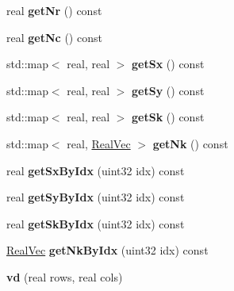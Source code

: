 \begin{DoxyCompactItemize}
\item 
\mbox{\label{classvd_a1a1634d6906eb0af4d877c2af3292ca7}} 
real {\bfseries get\+Nr} () const
\item 
\mbox{\label{classvd_ab0de0a5b8929ed7a7bb6ca902a462dd4}} 
real {\bfseries get\+Nc} () const
\item 
\mbox{\label{classvd_a340f3f92b9ae32ff0f3eb2ce6cf12bd6}} 
std\+::map$<$ real, real $>$ {\bfseries get\+Sx} () const
\item 
\mbox{\label{classvd_a13a2a103b632b3acf41b925b5b31449e}} 
std\+::map$<$ real, real $>$ {\bfseries get\+Sy} () const
\item 
\mbox{\label{classvd_a5c6dc6e749c955b5ee26139e19a02e0b}} 
std\+::map$<$ real, real $>$ {\bfseries get\+Sk} () const
\item 
\mbox{\label{classvd_a90613fc46f246a5450e26487caff33f9}} 
std\+::map$<$ real, \mbox{\hyperlink{aux_8h_ac0a1a538b45426e056715d1f59f854ab}{Real\+Vec}} $>$ {\bfseries get\+Nk} () const
\item 
\mbox{\label{classvd_a960d4b8fbedb7cbb0686ad42e19d6396}} 
real {\bfseries get\+Sx\+By\+Idx} (uint32 idx) const
\item 
\mbox{\label{classvd_a0f630fc80e57d3e17ab036f75afde006}} 
real {\bfseries get\+Sy\+By\+Idx} (uint32 idx) const
\item 
\mbox{\label{classvd_a4d2c835e7804c4242dce6d411f01ce0a}} 
real {\bfseries get\+Sk\+By\+Idx} (uint32 idx) const
\item 
\mbox{\label{classvd_a4d058d2d1d675a741a83776c95b2acfb}} 
\mbox{\hyperlink{aux_8h_ac0a1a538b45426e056715d1f59f854ab}{Real\+Vec}} {\bfseries get\+Nk\+By\+Idx} (uint32 idx) const
\item 
\mbox{\label{classvd_a765c16ee377a2a0f9651d555edd3a158}} 
{\bfseries vd} (real rows, real cols)
\end{DoxyCompactItemize}
